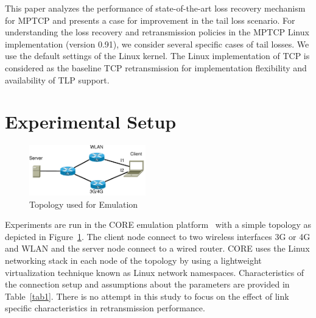 \documentclass[10pt,conference]{IEEEtran}
\begin{document}

This paper analyzes the performance of state-of-the-art loss recovery mechanism for MPTCP and presents a case for improvement in the tail loss 
scenario. For understanding the loss recovery and retransmission policies in the MPTCP Linux implementation (version 0.91), we consider several specific 
cases of tail losses. We use the default settings of the Linux kernel. The Linux implementation of TCP is considered as the baseline TCP 
retransmission for implementation flexibility and availability of TLP support.

\section{Experimental Setup}\label{exsetup}
\begin{figure}
\begin{center}
\includegraphics[angle=0, width=0.45\textwidth]{images/fortest.pdf}
\caption{Topology used for Emulation}\label{fig1}
\end{center}
\end{figure}

Experiments are run in the CORE emulation platform~\cite{CORE} with a simple topology as depicted in Figure~\ref{fig1}. The client node connect to two wireless interfaces 3G or 4G and WLAN and the server node connect to a wired router.
CORE uses the Linux networking stack in each node of the topology by using a lightweight virtualization technique known as Linux network namespaces.
Characteristics of the connection setup and assumptions about the parameters are provided in Table~\ref{tab1}.
There is no attempt in this study to focus on the effect of link specific characteristics in retransmission performance.
\end{document}
